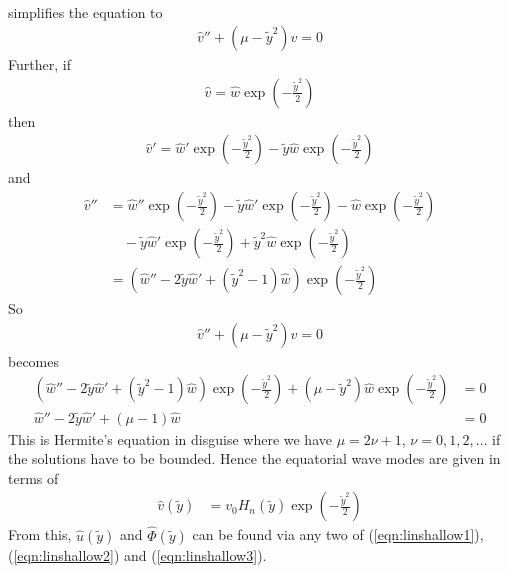 \begin{solution}
\begin{align}
\end{align}
simplifies the equation to 
\begin{align}
\hat{v}'' + (\mu - \tilde{y}^2)\hat{v} = 0    
\end{align}
Further, if
\begin{align}
\hat{v} = \hat{w} \exp(-\frac{\tilde{y}^2}{2})
\end{align}
then 
\begin{align}
\hat{v}' = \hat{w}' \exp(-\frac{\tilde{y}^2}{2}) - \tilde{y}\hat{w} \exp(-\frac{\tilde{y}^2}{2})
\end{align}
and
\begin{align}
\hat{v}'' &= \hat{w}'' \exp(-\frac{\tilde{y}^2}{2}) - \tilde{y}\hat{w}' \exp(-\frac{\tilde{y}^2}{2}) - \hat{w} \exp(-\frac{\tilde{y}^2}{2}) \nonumber \\
&\quad - \tilde{y}\hat{w}' \exp(-\frac{\tilde{y}^2}{2}) + \tilde{y}^2\hat{w} \exp(-\frac{\tilde{y}^2}{2}) \nonumber \\
&= (\hat{w}'' - 2\tilde{y}\hat{w}' + (\tilde{y}^2-1)\hat{w})\exp(-\frac{\tilde{y}^2}{2})
\end{align}
So
\begin{align}
\hat{v}'' + (\mu - \tilde{y}^2)\hat{v} = 0
\end{align}
becomes
\begin{align}
(\hat{w}'' - 2\tilde{y}\hat{w}' + (\tilde{y}^2-1)\hat{w})\exp(-\frac{\tilde{y}^2}{2}) + (\mu - \tilde{y}^2)\hat{w} \exp(-\frac{\tilde{y}^2}{2}) &= 0 \nonumber \\
\hat{w}'' - 2\tilde{y}\hat{w}' + (\mu-1)\hat{w} &= 0
\end{align}
This is Hermite's equation in disguise where we have $\mu = 2\nu + 1$, $\nu = 0, 1, 2, \ldots$ if the solutions have to be bounded. Hence the equatorial wave modes are given in terms of
\begin{align}
\hat{v}(\tilde{y}) &= v_0H_n(\tilde{y})\exp(-\frac{\tilde{y}^2}{2})    
\end{align}
From this, $\hat{u}(\tilde{y})$ and $\hat{\Phi}(\tilde{y})$ can be found via any two of (\ref{eqn:linshallow1}), (\ref{eqn:linshallow2}) and (\ref{eqn:linshallow3}).
\end{solution}
